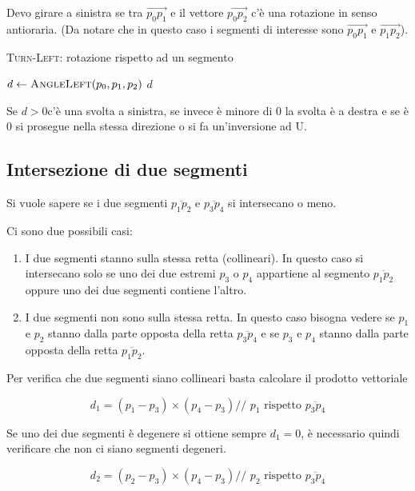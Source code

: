 Devo girare a sinistra se tra $\overrightarrow{p_0p_1}$ e il vettore $\overrightarrow{p_0p_2}$ c'è una rotazione in senso antioraria. (Da notare che in questo caso i segmenti di interesse sono $\overrightarrow{p_0p_1}$ e $\overrightarrow{p_1p_2}$).

\begin{breakablealgorithm}
	\caption{\textsc{Turn-Left}: rotazione rispetto ad un segmento}
	\begin{algorithmic}[1]
			\State $d \gets \textsc{AngleLeft}(p_0,p_1,p_2)$
			\State \Return $d$
		\EndFunction
	\end{algorithmic}
\end{breakablealgorithm}

Se $d >0 $c'è una svolta a sinistra, se invece è minore di 0 la svolta è a destra e se è 0 si prosegue nella stessa direzione o si fa un'inversione ad U.

\subsection{Intersezione di due segmenti}\label{intersezione-di-due-segmenti}

Si vuole sapere se i due segmenti $\overline{p_1p_2}$ e $\overline{p_3p_4}$ si intersecano o meno.

Ci sono due possibili casi:

\begin{enumerate}
\item
  I due segmenti stanno sulla stessa retta (collineari). In questo caso si intersecano solo se uno dei due estremi $p_3$ o $p_4$ appartiene al segmento $\overline{p_1p_2}$ oppure uno dei due segmenti contiene l'altro.
\item
  I due segmenti non sono sulla stessa retta. In questo caso bisogna vedere se $p_1$ e $p_2$ stanno dalla parte opposta della retta $\overline{p_3p_4}$ e se $p_3$  e $p_4$ stanno dalla parte opposta della retta $\overline{p_1p_2}$.
\end{enumerate}

Per verifica che due segmenti siano collineari basta calcolare il prodotto vettoriale

$$
d_1 = (p_1-p_3) \times (p_4-p_3) \text{// } p_1\text{ rispetto } \overline{p_3p_4}
$$

Se uno dei due segmenti è degenere si ottiene sempre $d_1 = 0$, è necessario quindi verificare che non ci siano segmenti degeneri.

$$
d_2 = (p_2-p_3) \times (p_4-p_3) \text{// } p_2\text{ rispetto } \overline{p_3p_4}
$$


